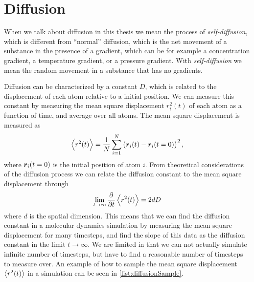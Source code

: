 \section{Diffusion}
When we talk about diffusion in this thesis we mean the process of \emph{self-diffusion}, which is different from ``normal'' diffusion, which is the net movement of a substance in the presence of a gradient, which can be for example a concentration gradient, a temperature gradient, or a pressure gradient. With \emph{self-diffusion} we mean the random movement in a substance that has no gradients.

Diffusion can be characterized by a constant $D$, which is related to the displacement of each atom relative to a initial position. We can measure this constant by measuring the mean square displacement $r_i^2(t)$ of each atom as a function of time, and average over all atoms. The mean square displacement is measured as
\begin{align*}
    \Braket{r^2(t)} = \frac{1}{N} \sum_{i=1}^N \left( \boldsymbol{r}_i(t) - \boldsymbol{r}_i(t=0) \right)^2,
\end{align*}
where $\boldsymbol{r}_i(t=0)$ is the initial position of atom $i$. From theoretical considerations of the diffusion process we can relate the diffusion constant to the mean square displacement through\cite[Section~4.4.1]{frenkel2001understanding}
\begin{align}
    \lim_{t\rightarrow \infty}\dpd{}{t}\Braket{r^2(t)} = 2dD\label{eq:diffusion_derivative}
\end{align}
where $d$ is the spatial dimension. This means that we can find the diffusion constant in a molecular dynamics simulation by measuring the mean square displacement for many timesteps, and find the slope of this data as the diffusion constant in the limit $t\rightarrow \infty$. We are limited in that we can not actually simulate infinite number of timesteps, but have to find a reasonable number of timesteps to measure over. An example of how to sample the mean square displacement $\Braket{r^2(t)}$ in a simulation can be seen in \cref{list:diffusionSample}.
%
%
